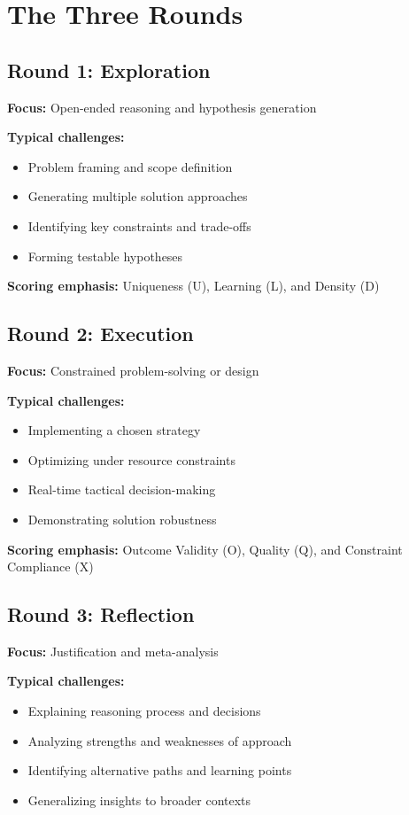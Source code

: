 \section{The Three Rounds}

\subsection{Round 1: Exploration}

\textbf{Focus:} Open-ended reasoning and hypothesis generation

\textbf{Typical challenges:}
\begin{itemize}[leftmargin=*]
  \item Problem framing and scope definition
  \item Generating multiple solution approaches
  \item Identifying key constraints and trade-offs
  \item Forming testable hypotheses
\end{itemize}

\textbf{Scoring emphasis:} Uniqueness (U), Learning (L), and Density (D)

\subsection{Round 2: Execution}

\textbf{Focus:} Constrained problem-solving or design

\textbf{Typical challenges:}
\begin{itemize}[leftmargin=*]
  \item Implementing a chosen strategy
  \item Optimizing under resource constraints
  \item Real-time tactical decision-making
  \item Demonstrating solution robustness
\end{itemize}

\textbf{Scoring emphasis:} Outcome Validity (O), Quality (Q), and Constraint Compliance (X)

\subsection{Round 3: Reflection}

\textbf{Focus:} Justification and meta-analysis

\textbf{Typical challenges:}
\begin{itemize}[leftmargin=*]
  \item Explaining reasoning process and decisions
  \item Analyzing strengths and weaknesses of approach
  \item Identifying alternative paths and learning points
  \item Generalizing insights to broader contexts
\end{itemize}

